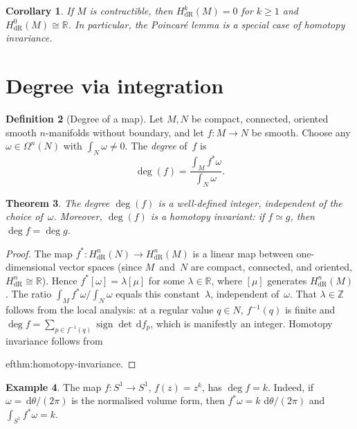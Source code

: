 \documentclass[12pt,a4paper,openany]{book}
\newtheorem{theorem}{Theorem}[section]
\newtheorem{corollary}[theorem]{Corollary}
\theoremstyle{definition}
\newtheorem{definition}[theorem]{Definition}
\newtheorem{example}[theorem]{Example}
\theoremstyle{remark}
\newcommand{\Z}{\mathbb{Z}}
\newcommand{\R}{\mathbb{R}}
\newcommand{\dd}{\,\mathrm{d}}
\begin{document}
\begin{corollary}\label{cor:contractible}
If $M$ is contractible, then $H^k_{\mathrm{dR}}(M) = 0$ for $k\ge 1$
and $H^0_{\mathrm{dR}}(M)\cong\R$.  In particular, the Poincar\'e
lemma is a special case of homotopy invariance.
\end{corollary}

\section{Degree via integration}\label{sec:degree-integration}

\begin{definition}[Degree of a map]\label{def:degree-integration}
Let $M,N$ be compact, connected, oriented smooth $n$-manifolds without
boundary, and let $f\colon M\to N$ be smooth.  Choose any
$\omega\in\Omega^n(N)$ with $\int_N\omega \ne 0$.  The \emph{degree}
of~$f$ is
\[
  \deg(f) = \frac{\int_M f^*\omega}{\int_N\omega}.
\]
\end{definition}

\begin{theorem}\label{thm:degree-well-defined}
The degree $\deg(f)$ is a well-defined integer, independent of the choice
of~$\omega$.  Moreover, $\deg(f)$ is a homotopy invariant: if
$f\simeq g$, then $\deg f = \deg g$.
\end{theorem}

\begin{proof}
The map $f^*\colon H^n_{\mathrm{dR}}(N)\to H^n_{\mathrm{dR}}(M)$ is
a linear map between one-dimensional vector spaces (since $M$~and~$N$
are compact, connected, and oriented, $H^n_{\mathrm{dR}}\cong\R$).
Hence $f^*[\omega] = \lambda[\mu]$ for some $\lambda\in\R$,
where $[\mu]$ generates $H^n_{\mathrm{dR}}(M)$.  The ratio
$\int_M f^*\omega / \int_N\omega$ equals this constant~$\lambda$,
independent of~$\omega$.  That $\lambda\in\Z$ follows from the local
analysis: at a regular value $q\in N$, $f^{-1}(q)$ is finite and
$\deg f = \sum_{p\in f^{-1}(q)}\operatorname{sign}\det\dd f_p$,
which is manifestly an integer.  Homotopy invariance follows from

ef{thm:homotopy-invariance}.
\end{proof}

\begin{example}\label{ex:degree-circle}
The map $f\colon S^1\to S^1$, $f(z) = z^k$, has $\deg f = k$.
Indeed, if $\omega = \dd\theta/(2\pi)$ is the normalised volume form,
then $f^*\omega = k\,\dd\theta/(2\pi)$ and
$\int_{S^1}f^*\omega = k$.
\end{example}
\end{document}
